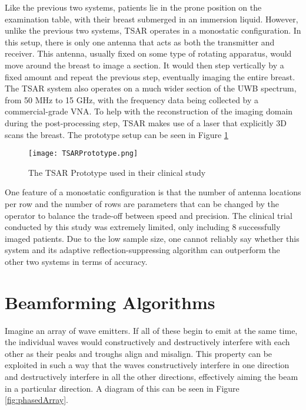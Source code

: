 Like the previous two systems, patients lie in the prone position on the examination table, with their breast submerged
in an immersion liquid. However, unlike the previous two systems, TSAR operates in a monostatic configuration. In this
setup, there is only one antenna that acts as both the transmitter and receiver. This antenna, usually fixed on some
type of rotating apparatus, would move around the breast to image a section. It would then step vertically by a fixed
amount and repeat the previous step, eventually imaging the entire breast. The TSAR system also operates on a much wider
section of the UWB spectrum, from 50 MHz to 15 GHz, with the frequency data being collected by a commercial-grade VNA.
To help with the reconstruction of the imaging domain during the post-processing step, TSAR makes use of a laser that
explicitly 3D scans the breast. The prototype setup can be seen in Figure \ref{fig:TSARPrototype} \hfill \break
\begin{figure}
    \texttt{[image: TSARPrototype.png]}
    \centering
    \caption{The TSAR Prototype used in their clinical study \cite{bourquiPrototypeSystemMeasuring2012}}
    \label{fig:TSARPrototype}
\end{figure}
One feature of a monostatic configuration is that the number of antenna locations per row and the number of rows are
parameters that can be changed by the operator to balance the trade-off between speed and precision. The clinical trial
conducted by this study was extremely limited, only including 8 successfully imaged patients. Due to the low sample
size, one cannot reliably say whether this system and its adaptive reflection-suppressing algorithm can outperform the
other two systems in terms of accuracy. \hfill 

\section{Beamforming Algorithms}
Imagine an array of wave emitters. If all of these begin to emit at the same time, the individual waves would
constructively and destructively interfere with each other as their peaks and troughs align and misalign. This property
can be exploited in such a way that the waves constructively interfere in one direction and destructively interfere in
all the other directions, effectively aiming the beam in a particular direction. A diagram of this can be seen in Figure
\ref{fig:phasedArray}.

